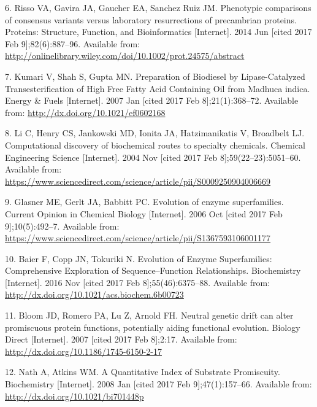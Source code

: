 \documentclass[12pt,twoside]{reedthesis}
\begin{document}
{  \hypertarget{ref-risso_phenotypic_2014}{}
  6. Risso VA, Gavira JA, Gaucher EA, Sanchez Ruiz JM. Phenotypic
  comparisons of consensus variants versus laboratory resurrections of
  precambrian proteins. Proteins: Structure, Function, and Bioinformatics
  {[}Internet{]}. 2014 Jun {[}cited 2017 Feb 9{]};82(6):887--96. Available
  from:
  \url{http://onlinelibrary.wiley.com/doi/10.1002/prot.24575/abstract}
  
  \hypertarget{ref-kumari_preparation_2007}{}
  7. Kumari V, Shah S, Gupta MN. Preparation of Biodiesel by
  Lipase-Catalyzed Transesterification of High Free Fatty Acid Containing
  Oil from Madhuca indica. Energy \& Fuels {[}Internet{]}. 2007 Jan
  {[}cited 2017 Feb 8{]};21(1):368--72. Available from:
  \url{http://dx.doi.org/10.1021/ef0602168}
  
  \hypertarget{ref-li_computational_2004}{}
  8. Li C, Henry CS, Jankowski MD, Ionita JA, Hatzimanikatis V, Broadbelt
  LJ. Computational discovery of biochemical routes to specialty
  chemicals. Chemical Engineering Science {[}Internet{]}. 2004 Nov
  {[}cited 2017 Feb 8{]};59(22--23):5051--60. Available from:
  \url{https://www.sciencedirect.com/science/article/pii/S0009250904006669}
  
  \hypertarget{ref-glasner_evolution_2006}{}
  9. Glasner ME, Gerlt JA, Babbitt PC. Evolution of enzyme superfamilies.
  Current Opinion in Chemical Biology {[}Internet{]}. 2006 Oct {[}cited
  2017 Feb 9{]};10(5):492--7. Available from:
  \url{https://www.sciencedirect.com/science/article/pii/S1367593106001177}
  
  \hypertarget{ref-baier_evolution_2016}{}
  10. Baier F, Copp JN, Tokuriki N. Evolution of Enzyme Superfamilies:
  Comprehensive Exploration of Sequence--Function Relationships.
  Biochemistry {[}Internet{]}. 2016 Nov {[}cited 2017 Feb
  8{]};55(46):6375--88. Available from:
  \url{http://dx.doi.org/10.1021/acs.biochem.6b00723}
  
  \hypertarget{ref-bloom_neutral_2007}{}
  11. Bloom JD, Romero PA, Lu Z, Arnold FH. Neutral genetic drift can
  alter promiscuous protein functions, potentially aiding functional
  evolution. Biology Direct {[}Internet{]}. 2007 {[}cited 2017 Feb
  8{]};2:17. Available from:
  \url{http://dx.doi.org/10.1186/1745-6150-2-17}
  
  \hypertarget{ref-nath_quantitative_2008}{}
  12. Nath A, Atkins WM. A Quantitative Index of Substrate Promiscuity.
  Biochemistry {[}Internet{]}. 2008 Jan {[}cited 2017 Feb
  9{]};47(1):157--66. Available from:
  \url{http://dx.doi.org/10.1021/bi701448p}
  
}
\end{document}
